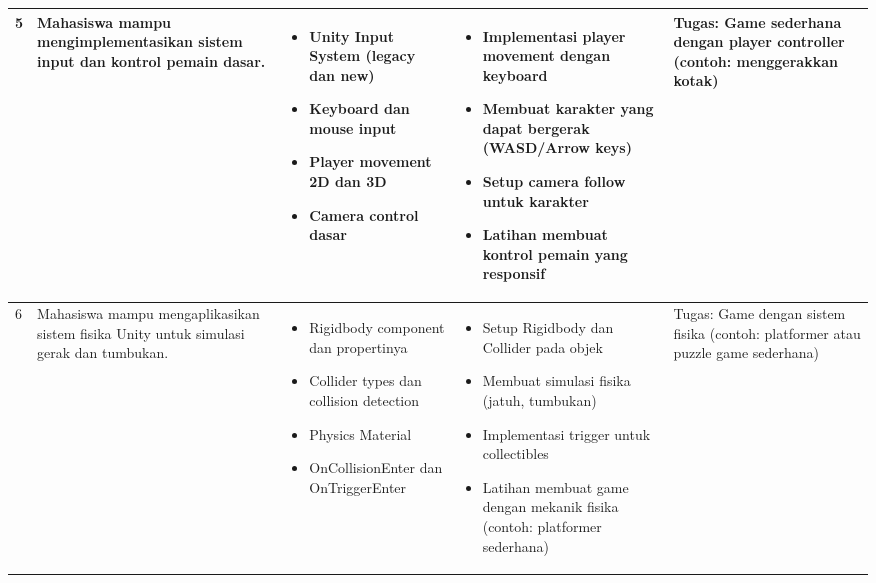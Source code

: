 \begin{longtable}{|p{0.8cm}|p{3.5cm}|p{4cm}|p{4cm}|p{2.5cm}|}
5 & Mahasiswa mampu mengimplementasikan sistem input dan kontrol pemain dasar. & 
\begin{itemize}[leftmargin=*,nosep]
\item Unity Input System (legacy dan new)
\item Keyboard dan mouse input
\item Player movement 2D dan 3D
\item Camera control dasar
\end{itemize} & 
\begin{itemize}[leftmargin=*,nosep]
\item Implementasi player movement dengan keyboard
\item Membuat karakter yang dapat bergerak (WASD/Arrow keys)
\item Setup camera follow untuk karakter
\item Latihan membuat kontrol pemain yang responsif
\end{itemize} & 
Tugas: Game sederhana dengan player controller (contoh: menggerakkan kotak) \\
\hline

6 & Mahasiswa mampu mengaplikasikan sistem fisika Unity untuk simulasi gerak dan tumbukan. & 
\begin{itemize}[leftmargin=*,nosep]
\item Rigidbody component dan propertinya
\item Collider types dan collision detection
\item Physics Material
\item OnCollisionEnter dan OnTriggerEnter
\end{itemize} & 
\begin{itemize}[leftmargin=*,nosep]
\item Setup Rigidbody dan Collider pada objek
\item Membuat simulasi fisika (jatuh, tumbukan)
\item Implementasi trigger untuk collectibles
\item Latihan membuat game dengan mekanik fisika (contoh: platformer sederhana)
\end{itemize} & 
Tugas: Game dengan sistem fisika (contoh: platformer atau puzzle game sederhana) \\
\hline


\end{longtable}
